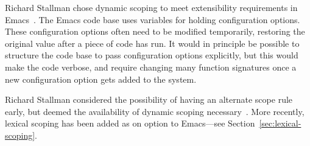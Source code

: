 \documentclass[format=acmsmall, review]{acmart}
\newcommand \Elisp {Emacs Lisp}
\begin{document}
Richard Stallman chose dynamic scoping to meet extensibility
requirements in Emacs~\cite{Stallman1981}.  The Emacs code base uses
variables for holding configuration options.  These configuration
options often need to be modified temporarily, restoring the original
value after a piece of code has run.  It would in principle be
possible to structure the code base to pass configuration options
explicitly, but this would make the code verbose, and require changing
many function signatures once a new configuration option gets added to
the system.

Richard Stallman considered the possibility of having an alternate
scope rule early, but deemed the availability of dynamic scoping
necessary~\cite{Stallman1981}.  More recently, lexical scoping has
been added as on option to Emacs---see
Section~\ref{sec:lexical-scoping}.

\end{document}
